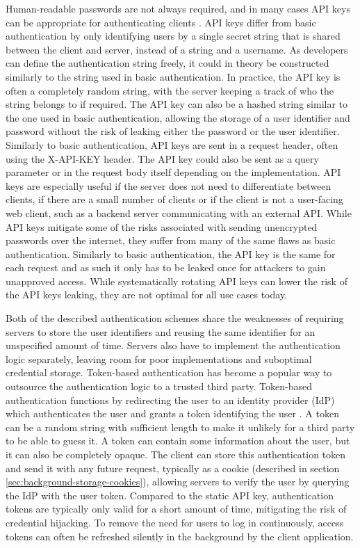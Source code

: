 Human-readable passwords are not always required, and in many cases API keys can be appropriate for authenticating clients \citep{farrell_api_2009}.
API keys differ from basic authentication by only identifying users by a single secret string that is shared between the client and server, instead of a string and a username.
As developers can define the authentication string freely, it could in theory be constructed similarly to the string used in basic authentication.
In practice, the API key is often a completely random string, with the server keeping a track of who the string belongs to if required.
The API key can also be a hashed string similar to the one used in basic authentication, allowing the storage of a user identifier and password without the risk of leaking either the password or the user identifier.
Similarly to basic authentication, API keys are sent in a request header, often using the X-API-KEY header.
The API key could also be sent as a query parameter or in the request body itself depending on the implementation.
API keys are especially useful if the server does not need to differentiate between clients, if there are a small number of clients or if the client is not a user-facing web client, such as a backend server communicating with an external API.
While API keys mitigate some of the risks associated with sending unencrypted passwords over the internet, they suffer from many of the same flaws as basic authentication.
Similarly to basic authentication, the API key is the same for each request and as such it only has to be leaked once for attackers to gain unapproved access.
While systematically rotating API keys can lower the risk of the API keys leaking, they are not optimal for all use cases today.

Both of the described authentication schemes share the weaknesses of requiring servers to store the user identifiers and reusing the same identifier for an unspecified amount of time.
Servers also have to implement the authentication logic separately, leaving room for poor implementations and suboptimal credential storage.
Token-based authentication has become a popular way to outsource the authentication logic to a trusted third party.
Token-based authentication functions by redirecting the user to an identity provider (IdP) which authenticates the user and grants a token identifying the user \citep{hardt_oauth_2012}.
A token can be a random string with sufficient length to make it unlikely for a third party to be able to guess it.
A token can contain some information about the user, but it can also be completely opaque.
The client can store this authentication token and send it with any future request, typically as a cookie (described in section \ref{sec:background-storage-cookies}), allowing servers to verify the user by querying the IdP with the user token.
Compared to the static API key, authentication tokens are typically only valid for a short amount of time, mitigating the risk of credential hijacking.
To remove the need for users to log in continuously, access tokens can often be refreshed silently in the background by the client application.



